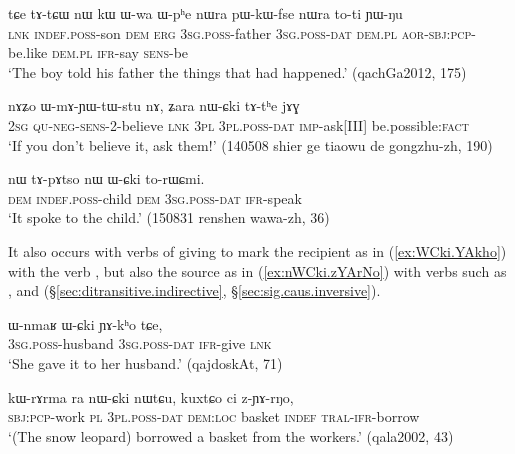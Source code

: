 \begin{exe}
\ex \label{ex:Wphe.toti}
\gll tɕe tɤ-tɕɯ nɯ kɯ ɯ-wa ɯ-pʰe nɯra pɯ-kɯ-fse nɯra to-ti ɲɯ-ŋu \\
\textsc{lnk} \textsc{indef}.\textsc{poss}-son \textsc{dem} \textsc{erg} \textsc{3sg}.\textsc{poss}-father \textsc{3sg}.\textsc{poss}-\textsc{dat} \textsc{dem}.\textsc{pl} \textsc{aor}-\textsc{sbj}:\textsc{pcp}-be.like \textsc{dem}.\textsc{pl}  \textsc{ifr}-say \textsc{sens}-be \\
\glt `The boy told his father the things that had happened.' (qachGa2012, 175)
\end{exe}

\begin{exe}
\ex \label{ex:nWCki.tAthe}
\gll nɤʑo ɯ-mɤ-ɲɯ-tɯ-stu nɤ, ʑara nɯ-ɕki tɤ-tʰe jɤɣ \\
\textsc{2sg} \textsc{qu}-\textsc{neg}-\textsc{sens}-2-believe \textsc{lnk} \textsc{3pl} \textsc{3pl}.\textsc{poss}-\textsc{dat} \textsc{imp}-ask[III] be.possible:\textsc{fact} \\
\glt `If you don't believe it, ask them!' (140508 shier ge tiaowu de gongzhu-zh, 190)
\end{exe}

\begin{exe}
\ex \label{ex:WCki.torWCmi}
\gll nɯ tɤ-pɤtso nɯ ɯ-ɕki to-rɯɕmi. \\
\textsc{dem} \textsc{indef}.\textsc{poss}-child \textsc{dem} \textsc{3sg}.\textsc{poss}-\textsc{dat} \textsc{ifr}-speak \\
\glt  `It spoke to the child.' (150831 renshen wawa-zh, 36)
\end{exe}

It also occurs with verbs of giving to mark the recipient as in (\ref{ex:WCki.YAkho}) with the verb , but also the source as in (\ref{ex:nWCki.zYArNo}) with verbs such as ,  and  (§\ref{sec:ditransitive.indirective}, §\ref{sec:sig.caus.inversive}).

 

\begin{exe}
\ex \label{ex:WCki.YAkho}
\gll  ɯ-nmaʁ ɯ-ɕki ɲɤ-kʰo tɕe,  \\
\textsc{3sg}.\textsc{poss}-husband \textsc{3sg}.\textsc{poss}-\textsc{dat} \textsc{ifr}-give \textsc{lnk} \\
\glt `She gave it to her husband.' (qajdoskAt, 71)
\end{exe}

\begin{exe}
\ex \label{ex:nWCki.zYArNo}
\gll 
kɯ-rɤrma ra nɯ-ɕki nɯtɕu, kuxtɕo ci z-ɲɤ-rŋo, \\
\textsc{sbj}:\textsc{pcp}-work \textsc{pl} \textsc{3pl}.\textsc{poss}-\textsc{dat} \textsc{dem}:\textsc{loc} basket \textsc{indef} \textsc{tral}-\textsc{ifr}-borrow \\
\glt `(The snow leopard) borrowed a basket from the workers.' (qala2002, 43)
\end{exe}

